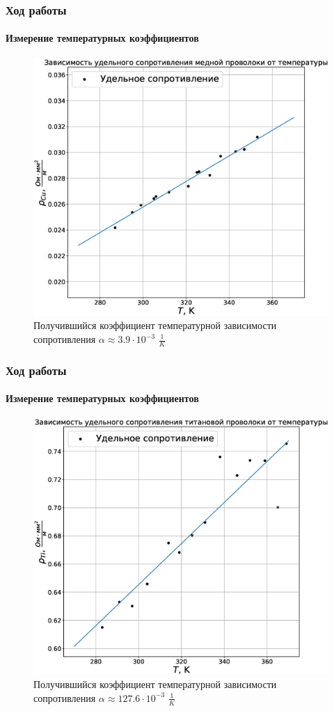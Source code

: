 \documentclass[8pt,pdf,hyperref={unicode}]{beamer}
\begin{document}
\begin{frame}
	\frametitle{Ход работы}
	\framesubtitle{Измерение температурных коэффициентов}
	\begin{center}
		\begin{figure}[h!]
			\centering
			\includegraphics[width=.55\linewidth]{Lab3_2.eps}
			\caption{Получившийся коэффициент температурной зависимости сопротивления $\alpha \approx 3.9 \cdot 10^{-3}$ $\frac{1}{K}$ }
			\label{fig2}
		\end{figure}
	\end{center}
\end{frame}
\begin{frame}
	\frametitle{Ход работы}
	\framesubtitle{Измерение температурных коэффициентов}
	\begin{center}
		\begin{figure}[h!]
			\centering
			\includegraphics[width=.55\linewidth]{Lab3_3.eps}
			\caption{Получившийся коэффициент температурной зависимости сопротивления $\alpha \approx 127.6 \cdot 10^{-3}$ $\frac{1}{K}$}
			\label{fig3}
		\end{figure}
	\end{center}
\end{frame}
\end{document}
